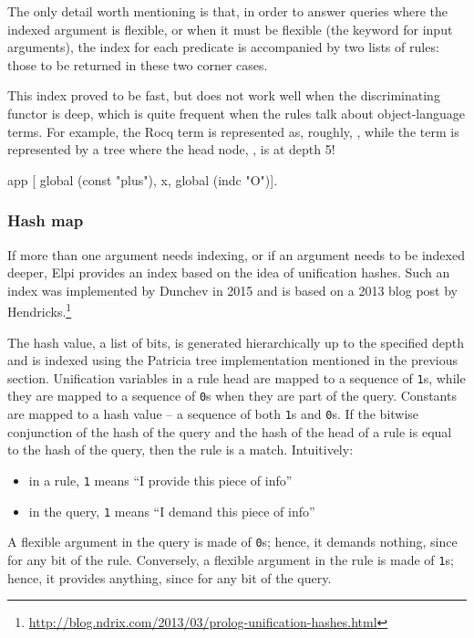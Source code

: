 \documentclass{these-ISSS}
\newenvironment{elpicode}
  {\VerbatimEnvironment\begin{elpibox}\begin{xelpicode}}{\end{xelpicode}
\end{elpibox}}
\begin{document}
The only detail worth mentioning is that, in order to answer queries where the
indexed argument is flexible, or when it must be flexible (the 
keyword for input arguments), the index for each predicate is accompanied by
two lists of rules: those to be returned in these two corner cases.


This index proved to be fast, but does not work well when the discriminating
functor is deep, which is quite frequent when the rules talk about object-language
terms. For example, the Rocq term  is represented as, roughly,
, while the term  is represented by a
tree where the head node, , is at depth 5!

\begin{elpicode}
  app [ global (const "plus"), x, global (indc "O")].
\end{elpicode}

\subsubsection{Hash map}


If more than one argument needs indexing, or if an argument needs to be
indexed deeper, Elpi provides an index based on the idea of unification
hashes. Such an index was implemented by Dunchev in 2015 and is based on a
2013 blog post by
Hendricks.\footnote{\url{http://blog.ndrix.com/2013/03/prolog-unification-hashes.html}}


The hash value, a list of bits, is generated hierarchically up to the specified
depth and is indexed using the Patricia tree implementation mentioned in the
previous section. Unification variables in a rule head are mapped to a
sequence of \texttt{1}s, while they are mapped to a sequence of \texttt{0}s
when they are part of the query. Constants are mapped to a hash value -- a
sequence of both \texttt{1}s and \texttt{0}s. If the bitwise conjunction
\ocaml{&} of the hash of the query and the hash of the head of a rule is equal
to the hash of the query, then the rule is a match. Intuitively:
\begin{itemize}
  \item in a rule, \texttt{1} means ``I provide this piece of info''
  \item in the query, \texttt{1} means ``I demand this piece of info''
\end{itemize}


\noindent
A flexible argument in the query is made of \texttt{0}s; hence, it demands
nothing, since  for any bit  of the rule.
Conversely, a flexible argument in the rule is made of \texttt{1}s; hence, it
provides anything, since  for any bit  of the query.
\end{document}
